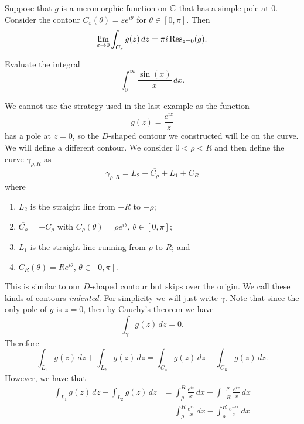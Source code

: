 \begin{lemma}
    Suppose that $g$ is a meromorphic function on $\mathbb{C}$ that has a simple pole at $0$.
    Consider the contour 
    $C_{\varepsilon}(\theta) = \varepsilon e^{i\theta}$ 
    for 
    $\theta \in [0, \pi]$.
    Then
    \[
        \lim_{\varepsilon \to 0} \int_{C_\varepsilon} g(z) \,dz = \pi i \operatorname{Res}_{z = 0}(g).
    \]
\end{lemma}

\begin{example}
    Evaluate the integral
    \[
        \int_0^\infty \frac{\sin(x)}{x} \,dx.
    \]
\end{example}

\begin{solution}
    We cannot use the strategy used in the last example as the function
    \[
        g(z) = \frac{e^{iz}}{z}
    \]
    has a pole at $z = 0$, so the $D$-shaped contour we constructed will lie on the curve.
    We will define a different contour.
    We consider $0 < \rho < R$ and then define the curve $\gamma_{\rho, R}$ as
    \[
        \gamma_{\rho, R} = L_2 + \overline{C_\rho} + L_1 + C_R
    \]
    where
    \begin{enumerate}
        \item $L_2$ is the straight line from $-R$ to $-\rho$;
        \item $\overline{C_\rho} = -C_\rho$ with $C_\rho(\theta) = \rho e^{i\theta}$, $\theta \in [0, \pi]$;
        \item $L_1$ is the straight line running from $\rho$ to $R$; and
        \item $C_R(\theta) = R e^{i\theta}$, $\theta \in [0, \pi]$.
    \end{enumerate}
    This is similar to our $D$-shaped contour but skips over the origin.
    We call these kinds of contours \emph{indented}.
    For simplicity we will just write $\gamma$.
    Note that since the only pole of $g$ is $z = 0$, 
    then by Cauchy's theorem we have
    \[
        \int_\gamma g(z) \,dz = 0.
    \]
    Therefore
    \[
        \int_{L_1} g(z) \,dz + \int_{L_2} g(z) \,dz = \int_{C_\rho} g(z) \,dz - \int_{C_R} g(z) \,dz. \tag{$\star$}
    \]
    However, we have that
    \begin{align*}
        \int_{L_1} g(z) \,dz + \int_{L_2} g(z) \,dz
        &= \int_{\rho}^R \frac{e^{iz}}{x} \,dx + \int_{-R}^{-\rho} \frac{e^{ix}}{x} \,dx \\
        &= \int_{\rho}^{R} \frac{e^{ix}}{x} \,dx - \int_{\rho}^{R} \frac{e^{-ix}}{x} \,dx \\

\end{align*}
\end{solution}
